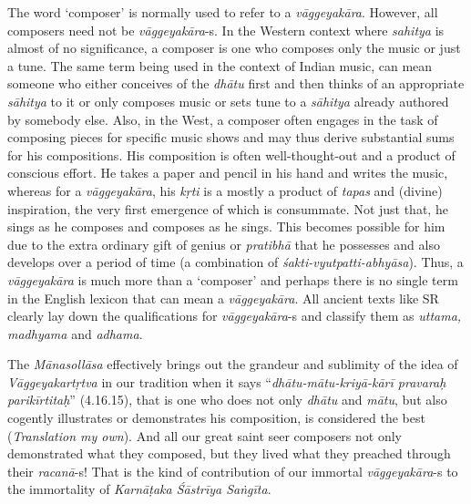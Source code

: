 The word ‘composer’ is normally used to refer to a \textit{vāggeyakāra}. However, all composers need not be \textit{vāggeyakāra}-s. In the Western context where \textit{sahitya} is almost of no significance, a composer is one who composes only the music or just a tune. The same term being used in the context of Indian music, can mean someone who either conceives of the \textit{dhātu} first and then thinks of an appropriate \textit{sāhitya} to it or only composes music or sets tune to a \textit{sāhitya} already authored by somebody else. Also, in the West, a composer often engages in the task of composing pieces for specific music shows and may thus derive substantial sums for his compositions. His composition is often well-thought-out and a product of conscious effort. He takes a paper and pencil in his hand and writes the music, whereas for a \textit{vāggeyakāra}, his \textit{kṛti} is a mostly a product of \textit{tapas} and (divine) inspiration, the very first emergence of which is consummate. Not just that, he sings as he composes and composes as he sings. This becomes possible for him due to the extra ordinary gift of genius or \textit{pratibhā} that he possesses and also develops over a period of time (a combination of \textit{śakti-vyutpatti-abhyāsa}). Thus, a \textit{vāggeyakāra} is much more than a ‘composer’ and perhaps there is no single term in the English lexicon that can mean a \textit{vāggeyakāra}. All ancient texts like SR clearly lay down the qualifications for \textit{vāggeyakāra}-s and classify them as \textit{uttama, madhyama} and \textit{adhama}.

The \textit{Mānasollāsa} effectively brings out the grandeur and sublimity of the idea of \textit{Vāggeyakartṛtva} in our tradition when it says “\textit{dhātu-mātu-kriyā-kārī pravaraḥ parikīrtitaḥ}” (4.16.15), that is one who does not only \textit{dhātu} and \textit{mātu}, but also cogently illustrates or demonstrates his composition, is considered the best (\textit{Translation my own}). And all our great saint seer composers not only demonstrated what they composed, but they lived what they preached through their \textit{racanā}-s! That is the kind of contribution of our immortal \textit{vāggeyakāra}-s to the immortality of \textit{Karnāṭaka Śāstrīya Saṅgīta}.

